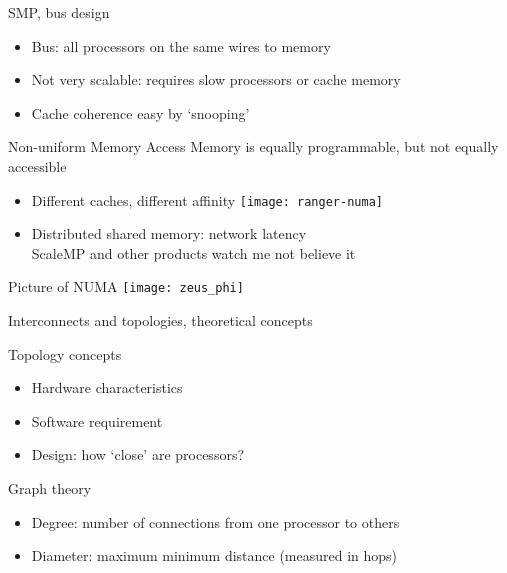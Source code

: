 \begin{numberedframe}{SMP, bus design}
  \begin{itemize}
  \item Bus: all processors on the same wires to memory
  \item Not very scalable: requires slow processors or cache memory
  \item Cache coherence easy by `snooping'
  \end{itemize}
\end{numberedframe}

\begin{numberedframe}{Non-uniform Memory Access}
  Memory is equally programmable, but not equally accessible
  \begin{itemize}
  \item Different caches, different affinity
  \texttt{[image: ranger-numa]}
  \item Distributed shared memory: network latency\\
    ScaleMP and other products {\tiny watch me not believe it}
  \end{itemize}
\end{numberedframe}

\begin{numberedframe}{Picture of NUMA}
\texttt{[image: zeus\_phi]}
\end{numberedframe}

 {Interconnects and topologies, theoretical concepts}

\begin{numberedframe}{Topology concepts}
  \begin{itemize}
  \item Hardware characteristics
  \item Software requirement
  \item Design: how `close' are processors?
  \end{itemize}
\end{numberedframe}

\begin{numberedframe}{Graph theory}
  \begin{itemize}
  \item Degree: number of connections from one processor to others
  \item Diameter: maximum minimum distance (measured in hops)
  \end{itemize}
\end{numberedframe}

